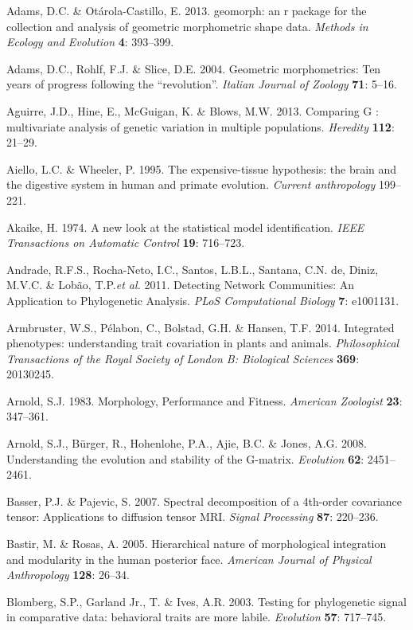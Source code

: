 \documentclass[12pt,twoside]{report}
\begin{document}
Adams, D.C. \& Otárola-Castillo, E. 2013. geomorph: an r package for the
collection and analysis of geometric morphometric shape data.
\emph{Methods in Ecology and Evolution} \textbf{4}: 393--399.

Adams, D.C., Rohlf, F.J. \& Slice, D.E. 2004. Geometric morphometrics:
Ten years of progress following the ``revolution''. \emph{Italian
Journal of Zoology} \textbf{71}: 5--16.

Aguirre, J.D., Hine, E., McGuigan, K. \& Blows, M.W. 2013. Comparing G :
multivariate analysis of genetic variation in multiple populations.
\emph{Heredity} \textbf{112}: 21--29.

Aiello, L.C. \& Wheeler, P. 1995. The expensive-tissue hypothesis: the
brain and the digestive system in human and primate evolution.
\emph{Current anthropology} 199--221.

Akaike, H. 1974. A new look at the statistical model identification.
\emph{IEEE Transactions on Automatic Control} \textbf{19}: 716--723.

Andrade, R.F.S., Rocha-Neto, I.C., Santos, L.B.L., Santana, C.N. de,
Diniz, M.V.C. \& Lobão, T.P.\emph{et al.} 2011. Detecting Network
Communities: An Application to Phylogenetic Analysis. \emph{PLoS
Computational Biology} \textbf{7}: e1001131.

Armbruster, W.S., Pélabon, C., Bolstad, G.H. \& Hansen, T.F. 2014.
Integrated phenotypes: understanding trait covariation in plants and
animals. \emph{Philosophical Transactions of the Royal Society of London
B: Biological Sciences} \textbf{369}: 20130245.

Arnold, S.J. 1983. Morphology, Performance and Fitness. \emph{American
Zoologist} \textbf{23}: 347--361.

Arnold, S.J., Bürger, R., Hohenlohe, P.A., Ajie, B.C. \& Jones, A.G.
2008. Understanding the evolution and stability of the G-matrix.
\emph{Evolution} \textbf{62}: 2451--2461.

Basser, P.J. \& Pajevic, S. 2007. Spectral decomposition of a 4th-order
covariance tensor: Applications to diffusion tensor MRI. \emph{Signal
Processing} \textbf{87}: 220--236.

Bastir, M. \& Rosas, A. 2005. Hierarchical nature of morphological
integration and modularity in the human posterior face. \emph{American
Journal of Physical Anthropology} \textbf{128}: 26--34.

Blomberg, S.P., Garland Jr., T. \& Ives, A.R. 2003. Testing for
phylogenetic signal in comparative data: behavioral traits are more
labile. \emph{Evolution} \textbf{57}: 717--745.
\end{document}
